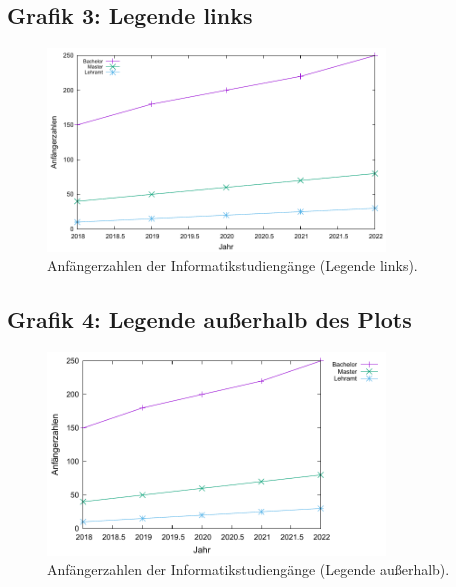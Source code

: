 \documentclass[a4paper,12pt]{article}
\begin{document}
\subsection*{Grafik 3: Legende links}
\begin{figure}[h!]
    \centering
    \includegraphics[width=0.8\textwidth]{plot3.pdf}
    \caption{Anfängerzahlen der Informatikstudiengänge (Legende links).}
\end{figure}

\subsection*{Grafik 4: Legende außerhalb des Plots}
\begin{figure}[h!]
    \centering
    \includegraphics[width=0.8\textwidth]{plot4.pdf}
    \caption{Anfängerzahlen der Informatikstudiengänge (Legende außerhalb).}
\end{figure}
\end{document}
